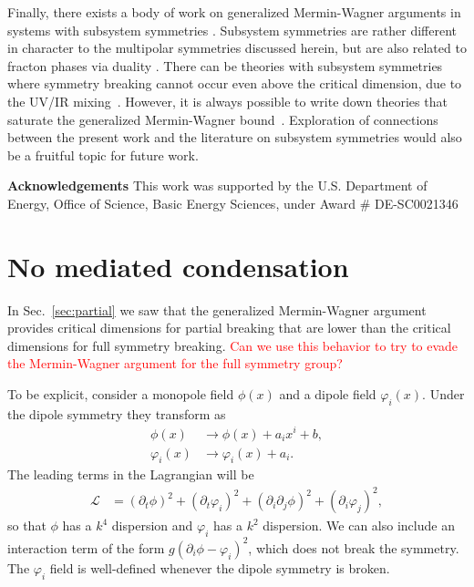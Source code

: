 \documentclass[pra,aps,twocolumn, amsfonts,amsmath,amssymb,nofootinbib,superscriptaddress]{revtex4-2}
\newcommand{\note}[1]{\textcolor{red}{#1}}
\newcommand{\nn}{\nonumber\\}
\newcommand{\goesto}{\rightarrow}
\renewcommand{\max}{\text{max}}
\begin{document}
Finally, there exists a body of work on generalized Mermin-Wagner arguments in systems with subsystem symmetries \cite{Batista2005, SeibergA, SeibergB, SeibergC, Gorantla2021, Distler2021}. Subsystem symmetries are rather different in character to the multipolar symmetries discussed herein, but are also related to fracton phases via duality \cite{VHF2}. There can be theories with subsystem symmetries where symmetry breaking cannot occur even above the critical dimension, due to the UV/IR mixing~\cite{Gorantla2021}. However, it is always possible to write down theories that saturate the generalized Mermin-Wagner bound~\cite{Distler2021}.
Exploration of connections between the present work and the literature on subsystem symmetries would also be a fruitful topic for future work. 

{\bf Acknowledgements} This work was supported by
the U.S. Department of Energy, Office of Science, Basic
Energy Sciences, under Award \# DE-SC0021346




\appendix

\section{No mediated condensation} \label{app:mediated}

In Sec.~\ref{sec:partial} we saw that the generalized Mermin-Wagner argument provides critical dimensions for partial breaking that are lower than the critical dimensions for full symmetry breaking. \note{Can we use this behavior to try to evade the Mermin-Wagner argument for the full symmetry group?}


To be explicit, consider a monopole field $\phi(x)$ and a dipole field $\varphi_i(x)$. Under the dipole symmetry they transform as 
\begin{align}
\phi(x) &\goesto \phi(x) + a_ix^i + b,\nn
\varphi_i(x) &\goesto \varphi_i(x) + a_i.
\end{align}
The leading terms in the Lagrangian will be
\begin{align}
\mathcal{L} &= (\partial_t \phi)^2 + (\partial_t \varphi_i)^2 + (\partial_i \partial_j \phi)^2 + (\partial_i \varphi_j)^2,
\end{align}
so that $\phi$ has a $k^4$ dispersion and $\varphi_i$ has a $k^2$ dispersion. We can also include an interaction term of the form $g(\partial_i \phi - \varphi_i)^2$, which does not break the symmetry.  The $\varphi_i$ field is well-defined whenever the dipole symmetry is broken.
\end{document}
